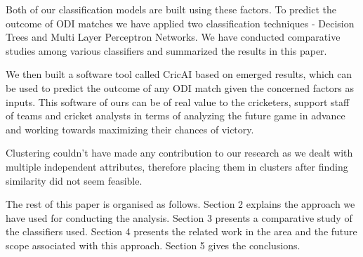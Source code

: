 \documentclass[a4paper, 10pt, conference]{IEEEtran}
\begin{document}
Both of our classification models are built using these factors. To predict the outcome of ODI matches we have applied two classification techniques - Decision Trees and Multi Layer Perceptron Networks. We have conducted comparative studies among various classifiers and summarized the results in this paper.

We then built a software tool called CricAI based on emerged results, which can be used to predict the outcome of any ODI match given the concerned factors as inputs. This software of ours can be of real value to the cricketers, support staff of teams and cricket analysts in terms of analyzing the future game in advance and working towards maximizing their chances of victory.

Clustering couldn't have made any contribution to our research as we dealt with multiple independent attributes, therefore placing them in clusters after finding similarity did not seem feasible.

The rest of this paper is organised as follows. Section 2 explains the approach we have used for conducting the analysis. Section 3 presents a comparative study of the classifiers used. Section 4 presents the related work in the area and the future scope associated with this approach. Section 5 gives the conclusions.
\end{document}
